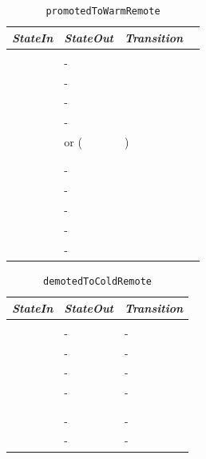 \begin{table}
  \begin{tabular}[h]{llll}
    \textit{StateIn}         & \textit{StateOut} & \textit{Transition} \\\hline\\[2pt]
    \InitialState{}          & - & \\[8pt]
    \ReservedOutboundState{} & - & \\[8pt]
    \UnnegotiatedStateAny{}  & - & \\[8pt]
    \OutboundStateUni{}      & - & \\[8pt]
    \OutboundStateDup{}      & \Prune{} or (\DuplexState{} & \PromotedToWarmDupRem{}) \\[8pt]
    \InboundIdleStateUni{}   & \InboundStateUni{} & \AwakeUniRem{} \\[8pt]
    \InboundIdleStateDup{}   & \InboundStateDup{} & \AwakeDupRem{} \\[8pt]
    \InboundStateUni{}       & - & \\[8pt]
    \InboundStateDup{}       & - & \\[8pt]
    \DuplexState{}           & - & \\[8pt]
    \TerminatingState{}      & - & \\[8pt]
    \TerminatedState{}       & - & \\[8pt]
  \end{tabular}
  \caption{\texttt{promotedToWarmRemote}}
  \label{table:promotedToWarmRemote}
\end{table}

\begin{table}
  \begin{tabular}[h]{lll}
    \textit{StateIn}         & \textit{StateOut} & \textit{Transition} \\\hline\\[2pt]
    \ReservedOutboundState{} & - & - \\[8pt]
    \UnnegotiatedStateAny{}  & - & - \\[8pt]
    \OutboundStateAny{}      & - & - \\[8pt]
    \InboundIdleStateAny{}   & - & - \\[8pt]
    \InboundStateAny{}       & \InboundIdleStateAny{} & \DemotedToColdAnyRem{} \\[8pt]
    \DuplexState{}           & \OutboundStateDupTau{} & \DemotedToColdDupRem{} \\[8pt]
    \TerminatingState{}      & - & - \\[8pt]
    \TerminatedState{}       & - & - \\[8pt]
  \end{tabular}
  \caption{\texttt{demotedToColdRemote}}
  \label{table:demotedToColdRemote}
\end{table}

